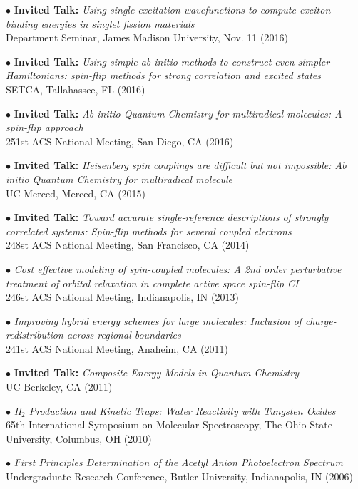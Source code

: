 \documentclass[10pt]{article}
\newenvironment{lonelist}[1][\enskip\textbullet]%
        {\vspace{-\baselineskip}\begin{list}{#1}{%
        \setlength{\partopsep}{0pt}%
        \setlength{\topsep}{0pt}}}
        {\end{list}\vspace{-.6\baselineskip}}
\begin{document}
\begin{lonelist}
\item[$\bullet$] \textbf{Invited Talk:} \textit{Using single-excitation wavefunctions to compute exciton-binding energies in singlet fission materials}\\
Department Seminar, James Madison University, Nov. 11 (2016)

\item[$\bullet$] \textbf{Invited Talk:} \textit{Using simple ab initio methods to construct even simpler Hamiltonians: spin-flip methods for strong correlation and excited states}\\
SETCA, Tallahassee, FL (2016)

\item[$\bullet$] \textbf{Invited Talk:} \textit{Ab initio Quantum Chemistry for multiradical molecules: A spin-flip approach}\\
251st ACS National Meeting, San Diego, CA (2016)

\item[$\bullet$] \textbf{Invited Talk:} \textit{Heisenberg spin couplings are difficult but not impossible: Ab initio Quantum Chemistry for multiradical molecule}\\
UC Merced, Merced, CA (2015) 

\item[$\bullet$] \textbf{Invited Talk:} \textit{Toward accurate single-reference descriptions of strongly correlated systems: Spin-flip methods for several coupled electrons}\\
248st ACS National Meeting, San Francisco, CA (2014) 

\item[$\bullet$] \textit{Cost effective modeling of spin-coupled molecules: A 2nd order perturbative treatment of orbital relaxation in complete active space spin-flip CI}\\
246st ACS National Meeting, Indianapolis, IN (2013) 

\item[$\bullet$] \textit{Improving hybrid energy schemes for large molecules: Inclusion of charge-redistribution across regional boundaries}\\ 
241st ACS National Meeting, Anaheim, CA (2011) 

\item[$\bullet$] \textbf{Invited Talk:} \textit{Composite Energy Models in Quantum Chemistry} \\
UC Berkeley, CA (2011)

\item[$\bullet$] \textit{H$_2$ Production and Kinetic Traps: Water Reactivity with Tungsten Oxides}\\ 
65th International Symposium on Molecular Spectroscopy, The Ohio State University, Columbus, OH (2010) 

\item[$\bullet$] \textit{First Principles Determination of the Acetyl Anion Photoelectron Spectrum}\\
Undergraduate Research Conference, Butler University, Indianapolis, IN (2006)\\\\
\end{lonelist}
\end{document}
